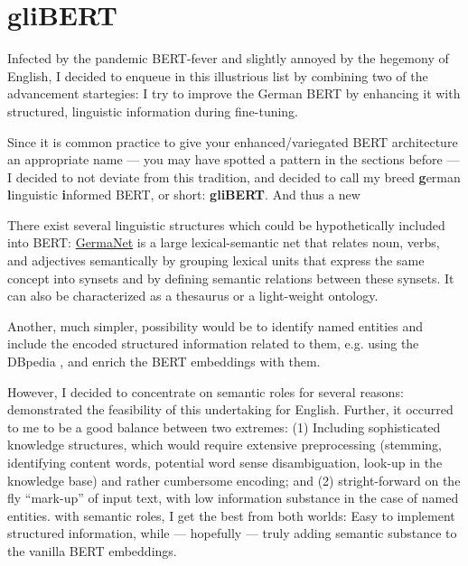 \section{gliBERT}

Infected by the pandemic BERT-fever and slightly annoyed by the hegemony of English, I decided to
enqueue in this illustrious list by combining two of the {\color{red} advancement startegies}: I try to improve
the German BERT by enhancing it with structured, linguistic information during fine-tuning.

Since it is common practice to give your enhanced/variegated BERT architecture an appropriate name --- you may have spotted
a pattern in the sections before --- I decided to not deviate from this tradition, and decided to call my breed
\textbf{g}erman \textbf{l}inguistic \textbf{i}nformed BERT, or short: \textbf{gliBERT}.
And thus a new

There exist several linguistic structures which could be hypothetically included into BERT:
\href{https://uni-tuebingen.de/en/faculties/faculty-of-humanities/departments/modern-languages/department-of-linguistics/chairs/general-and-computational-linguistics/ressources/lexica/germanet/}{GermaNet} \citep{hamp1997germanet}
is a large lexical-semantic net that relates noun, verbs, and adjectives semantically by
grouping lexical units that express the same concept into synsets and by defining semantic
relations between these synsets. It can also be characterized as a thesaurus or a light-weight
ontology.

Another, much simpler, possibility would be to identify named entities
and include the encoded structured
information related to them, e.g. using the DBpedia \citep{auer2007dbpedia}, and enrich
the BERT embeddings with them.

However, I decided to concentrate on semantic roles for several reasons: \citeauthor{zhang2019semantics}
demonstrated the feasibility of this undertaking for English. Further, it occurred to me to be a good
balance between two extremes: (1) Including sophisticated knowledge structures, which would
require extensive preprocessing (stemming, identifying content words, potential word sense
disambiguation, look-up in the knowledge base) and rather cumbersome encoding; and (2)
stright-forward on the fly ``mark-up'' of input text, with low information substance in the
case of named entities. with semantic roles, I get the best from both worlds: Easy to implement
structured information, while --- hopefully --- truly adding semantic substance to the vanilla
BERT embeddings.



